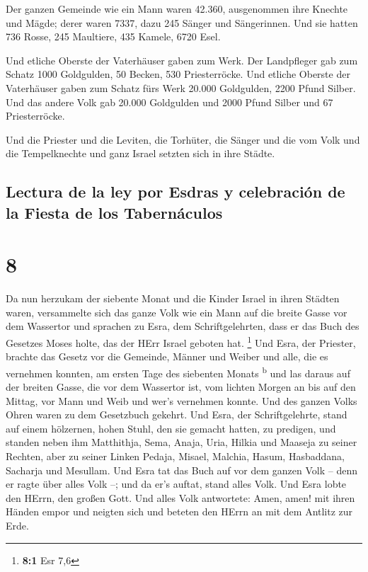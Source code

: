  Der ganzen Gemeinde wie ein Mann waren 42.360,
 ausgenommen ihre Knechte und Mägde; derer waren 7337,
dazu 245 Sänger und Sängerinnen.  Und sie hatten 736
Rosse, 245 Maultiere,  435 Kamele, 6720 Esel.

 Und etliche Oberste der Vaterhäuser gaben zum Werk. Der
Landpfleger gab zum Schatz 1000 Goldgulden, 50 Becken, 530
Priesterröcke.  Und etliche Oberste der Vaterhäuser gaben
zum Schatz fürs Werk 20.000 Goldgulden, 2200 Pfund Silber.
 Und das andere Volk gab 20.000 Goldgulden und 2000 Pfund
Silber und 67 Priesterröcke.

 Und die Priester und die Leviten, die Torhüter, die
Sänger und die vom Volk und die Tempelknechte und ganz Israel setzten
sich in ihre Städte.

\hypertarget{lectura-de-la-ley-por-esdras-y-celebraciuxf3n-de-la-fiesta-de-los-tabernuxe1culos}{%
\subsection{Lectura de la ley por Esdras y celebración de la Fiesta de
los
Tabernáculos}\label{lectura-de-la-ley-por-esdras-y-celebraciuxf3n-de-la-fiesta-de-los-tabernuxe1culos}}

\hypertarget{section-7}{%
\section{8}\label{section-7}}

 Da nun herzukam der siebente Monat und die Kinder Israel
in ihren Städten waren, versammelte sich das ganze Volk wie ein Mann auf
die breite Gasse vor dem Wassertor und sprachen zu Esra, dem
Schriftgelehrten, dass er das Buch des Gesetzes Moses holte, das der
HErr Israel geboten hat. \footnote{\textbf{8:1} Esr 7,6} 
Und Esra, der Priester, brachte das Gesetz vor die Gemeinde, Männer und
Weiber und alle, die es vernehmen konnten, am ersten Tage des siebenten
Monats \textsuperscript{b}  und las daraus auf der breiten
Gasse, die vor dem Wassertor ist, vom lichten Morgen an bis auf den
Mittag, vor Mann und Weib und wer's vernehmen konnte. Und des ganzen
Volks Ohren waren zu dem Gesetzbuch gekehrt.  Und Esra,
der Schriftgelehrte, stand auf einem hölzernen, hohen Stuhl, den sie
gemacht hatten, zu predigen, und standen neben ihm Matthithja, Sema,
Anaja, Uria, Hilkia und Maaseja zu seiner Rechten, aber zu seiner Linken
Pedaja, Misael, Malchia, Hasum, Hasbaddana, Sacharja und Mesullam.
 Und Esra tat das Buch auf vor dem ganzen Volk -- denn er
ragte über alles Volk --; und da er's auftat, stand alles Volk.
 Und Esra lobte den HErrn, den großen Gott. Und alles Volk
antwortete: Amen, amen! mit ihren Händen empor und neigten sich und
beteten den HErrn an mit dem Antlitz zur Erde.

